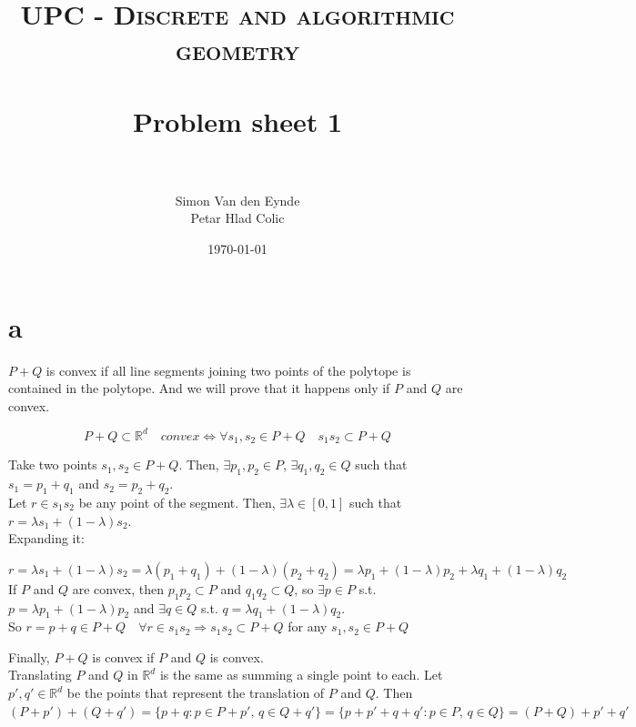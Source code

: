 \documentclass[paper=a4, fontsize=11pt]{scrartcl} %
\title{	
\normalfont \normalsize 
\textsc{UPC - Discrete and algorithmic geometry} \\ [25pt] %
\horrule{0.5pt} \\[0.4cm] %
\huge Problem sheet 1  \\ %
\horrule{2pt} \\[0.5cm] %
}
\author{Simon Van den Eynde \\ Petar Hlad Colic} %
\date{\normalsize\today} %
\theoremstyle{plain}
\begin{document}
\maketitle %

\section{a}
$P+Q$ is convex if all line segments joining two points of the polytope is contained in the polytope. And we will prove that it happens only if $P$ and $Q$ are convex.

$$P+Q\subset \mathbb{R}^d \quad convex \Longleftrightarrow \forall s_1,s_2 \in P+Q \quad s_1 s_2 \subset P+Q$$

Take two points $s_1,s_2\in P+Q$. Then, $\exists p_1,p_2 \!\! \in \!\! P$, $\exists q_1,q_2 \!\! \in \!\! Q$ such that $s_1 = p_1 + q_1$ and $s_2= p_2 + q_2$.\\

Let $r\in s_1 s_2$ be any point of the segment. Then, $\exists \lambda \in [0,1]$ such that $r = \lambda s_1 + \left( 1 - \lambda \right) s_2$.\\

Expanding it:

$r = \lambda s_1 + \left( 1 - \lambda \right) s_2 = \lambda \left(p_1 + q_1 \right) + \left( 1 - \lambda \right) \left( p_2 + q_2 \right) = \lambda p_1 + \left( 1 - \lambda \right) p_2 + \lambda q_1 + \left( 1 - \lambda \right) q_2$\\

If $P$ and $Q$ are convex, then $p_1p_2 \subset P$ and $q_1q_2 \subset Q$, so $\exists p \!\! \in \!\! P$ s.t. $p = \lambda p_1 + \left( 1 - \lambda \right) p_2$ and $\exists q \!\! \in \!\! Q$ s.t. $q = \lambda q_1 + \left( 1 - \lambda \right) q_2$.\\

So $r = p + q \in P+Q \quad \forall r \in s_1s_2 \Longrightarrow s_1s_2 \subset P+Q$ for any $s_1,s_2 \in P+Q$

Finally, $P+Q$ is convex if $P$ and $Q$ is convex.\\

Translating $P$ and $Q$ in $\mathbb{R}^d$ is the same as summing a single point to each. Let $p',q' \in \mathbb{R}^d$ be the points that represent the translation of $P$ and $Q$. Then $(P+p') + (Q+q') = \{p + q : p\in P + p',\,q\in Q + q'\} = \{p + p' + q + q' : p\in P,\,q\in Q\} = (P+Q)+p'+q'$
\end{document}
